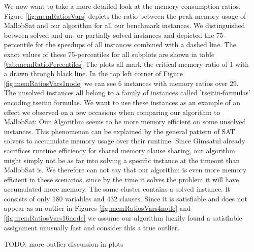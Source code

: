 \documentclass[12pt,a4paper,twoside]{scrartcl}
\numberwithin{equation}{section}
\begin{document}
\label{sec:peakMemRatios}
We now want to take a more detailed look at the memory consumption ratios. Figure \ref{fig:memRatiosVars} depicts the ratio between the peak memory usage of MallobSat and our algorithm for all our benchmark instances. We distinguished between solved and un- or partially solved instances and depicted the 75-percentile for the speedups of all instances combined with a dashed line. The exact values of these 75-percentiles for all subplots are shown in table \ref{tab:memRatioPercentiles} The plots all mark the critical memory ratio of 1 with a drawn through black line.
In the top left corner of Figure \ref{fig:memRatiosVars1node} we can see 6 instances with memory ratios over 29. The unsolved instances all belong to a family of instances called 'tseitin-formulas' encoding tseitin formulas. We want to use these instances as an example of an effect we observed on a few occasions when comparing our algorithm to MallobSat: Our Algorithm seems to be more memory efficient on some unsolved instances. This phenomenon can be explained by the general pattern of SAT solvers to accumulate memory usage over their runtime. Since Gimsatul already sacrifices runtime efficiency for shared memory clause sharing, our algorithm might simply not be as far into solving a specific instance at the timeout than MallobSat is. We therefore can not say that our algorithm is even more memory efficient in these scenarios, since by the time it solves the problem it will have accumulated more memory.
The same cluster contains a solved instance. It consists of only 180 variables and 432 clauses. Since it is satisfiable and does not appear as an outlier in Figures \ref{fig:memRatiosVars4node} and \ref{fig:memRatiosVars16node} we assume our algorithm luckily found a satisfiable assignment unusually fast and consider this a true outlier.

TODO: more outlier discussion in plots
\end{document}
